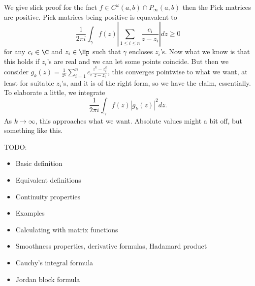 We give slick proof for the fact $f \in C^{\omega}(a, b) \cap P_{\infty}(a, b)$ then the Pick matrices are positive. Pick matrices being positive is equavalent to
\[
	\frac{1}{2 \pi i}\int_{\gamma} f(z) \left|\sum_{1 \leq i \leq n}\frac{c_{i}}{z - z_{i}} \right| d z \geq 0
\]
for any $c_{i} \in \C$ and $z_{i} \in \Hp$ such that $\gamma$ encloses $z_{i}$'s. Now what we know is that this holds if $z_{i}$'s are real and we can let some points coincide. But then we consider $g_{k}(z) = \frac{1}{z^{k}}\sum_{i = 1}^{n} c_{i} \frac{z^{k} - z_{i}^{k}}{z - z_{i}}$, this converges pointwise to what we want, at least for suitable $z_{i}$'s, and it is of the right form, so we have the claim, essentially. To elaborate a little, we integrate
\[
	\frac{1}{2 \pi i}\int_{\gamma} f(z) |g_{k}(z)|^{2} dz.
\]
As $k \to \infty$, this approaches what we want. Absolute values might a bit off, but something like this.


TODO:
\begin{itemize}
	\item Basic definition
	\item Equivalent definitions
	\item Continuity properties
	\item Examples
	\item Calculating with matrix functions
	\item Smoothness properties, derivative formulas, Hadamard product
	\item Cauchy's integral formula
	\item Jordan block formula
\end{itemize}
